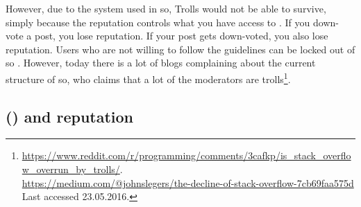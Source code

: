 However, due to the system used in \gls{so}, Trolls would not be able to survive, simply because the reputation controls what you have access to \cite{StackOverflow.com2016g}. 
If you down-vote a post, you lose reputation. 
If your post gets down-voted, you also lose reputation. 
Users who are not willing to follow the guidelines can be locked out of \gls{so} \cite{Atwood2009}.
However, today there is a lot of blogs complaining about the current structure of \gls{so}, who claims that a lot of the moderators are
trolls\footnote{\url{https://www.reddit.com/r/programming/comments/3cafkp/is_stack_overflow_overrun_by_trolls/}. \\	
	\url{https://medium.com/@johnslegers/the-decline-of-stack-overflow-7cb69faa575d} \\ 
	Last accessed 23.05.2016. 
}.

\subsection[Stack Overflow and reputation]{ () and reputation}
\label{sec:research_on_so}

